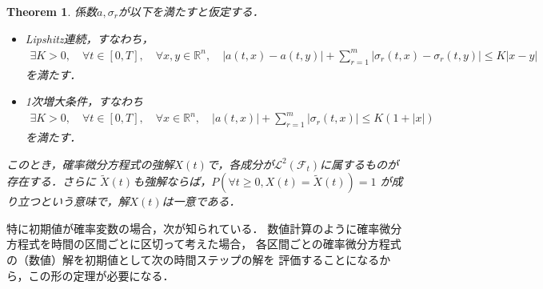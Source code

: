 \documentclass[dvipdfmx,autodetect-engine]{jsarticle}
\newtheorem{theorem}{Theorem}[section]
\theoremstyle{remark}
\theoremstyle{definition}
\newcommand{\R}{\mathbb{R}}
\newcommand{\abs}[1]{\left\lvert#1\right\rvert}
\begin{document}
\begin{theorem}\label{fundamental_existence}
    係数$a,\sigma_{r}$が以下を満たすと仮定する．
    \begin{itemize}
        \item Lipshitz連続，すなわち，
        \begin{align}
            \exists K>0,\quad \forall t \in [0,T],\quad \forall x,y \in \R^{n},\quad
            \abs{a(t,x)-a(t,y)} + \sum_{r=1}^{m} \abs{\sigma_{r}(t,x) - \sigma_{r}(t,y)} 
            \leq K\abs{x-y}
        \end{align}
        を満たす．
        \item 1次増大条件，すなわち
        \begin{align}
            \exists K>0,\quad \forall t \in [0,T],\quad \forall x\in \R^{n},\quad
            \abs{a(t,x)} + \sum_{r=1}^{m} \abs{\sigma_{r}(t,x)} \leq K(1+\abs{x})
        \end{align}
        を満たす．
    \end{itemize}
    このとき，確率微分方程式の強解$X(t)$で，各成分が$\mathcal{L}^2 (\mathcal{F}_{t})$に属するものが
    存在する．さらに
    $\tilde{X}(t)$も強解ならば，$P(\forall t \geq 0,X(t)=\tilde{X}(t))=1$
    が成り立つという意味で，解$X(t)$は一意である．
\end{theorem}


特に初期値が確率変数の場合，次が知られている．
数値計算のように確率微分方程式を時間の区間ごとに区切って考えた場合，
各区間ごとの確率微分方程式の（数値）解を初期値として次の時間ステップの解を
評価することになるから，この形の定理が必要になる．
\end{document}
